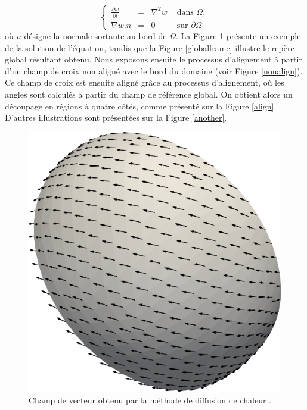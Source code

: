 \begin{equation}
\left\{
\begin{array}{lcll}
\displaystyle\frac{\partial w}{\partial t} & = & \nabla^2 w &\mbox{ dans }\Omega,\\[0.5cm]
\nabla w.n&=&0 & \mbox{ sur } \partial\Omega.
\end{array}
\right.
\label{eqn:heatequation}
\end{equation}
où $n$ désigne la normale sortante au bord de $\Omega$. La Figure \ref{solutionheat} présente un exemple de la solution de l'équation, tandis que la Figure \ref{globalframe} illustre le repère global résultant obtenu. Nous exposons ensuite le processus d'alignement à partir d'un champ de croix non aligné avec le bord du domaine (voir Figure \ref{nonalign}). Ce champ de croix est ensuite aligné grâce au processus d'alignement, où les angles sont calculés à partir du champ de référence global. On obtient alors un découpage en régions à quatre côtés, comme présenté sur la Figure \ref{align}. D'autres illustrations sont présentées sur la Figure \ref{another}.

\begin{figure}[!h]
\centering
\includegraphics[scale=0.4]{images/vector.png}
\caption{Champ de vecteur obtenu par la méthode de diffusion de chaleur \cite{sharp2019vector}.}
\label{solutionheat}
\end{figure}

